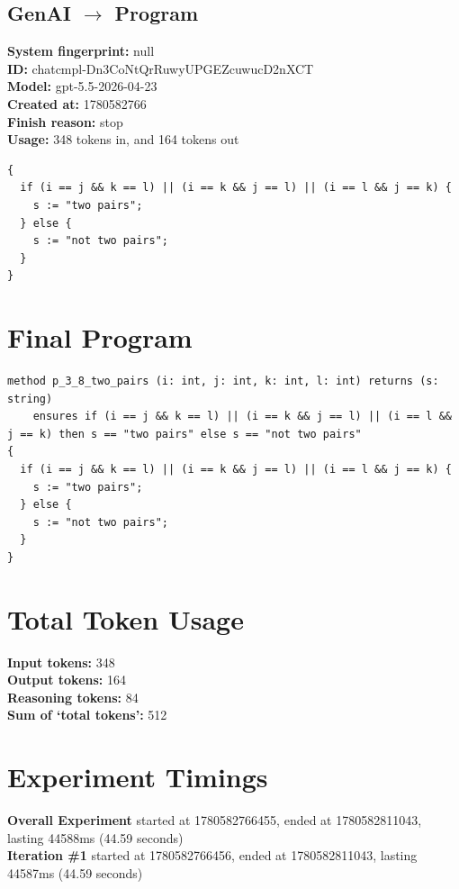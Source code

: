 \documentclass{article}
\begin{document}
\subsection*{GenAI $\rightarrow$ Program}
\textbf{System fingerprint: }null
\\\textbf{ID: }chatcmpl-Dn3CoNtQrRuwyUPGEZcuwucD2nXCT
\\\textbf{Model: }gpt-5.5-2026-04-23
\\\textbf{Created at: }1780582766
\\\textbf{Finish reason: }stop
\\\textbf{Usage: }348 tokens in, and 164 tokens out
\begin{lstlisting}
{
  if (i == j && k == l) || (i == k && j == l) || (i == l && j == k) {
    s := "two pairs";
  } else {
    s := "not two pairs";
  }
}
\end{lstlisting}
\section*{Final Program}
\begin{lstlisting}
method p_3_8_two_pairs (i: int, j: int, k: int, l: int) returns (s: string)
	ensures if (i == j && k == l) || (i == k && j == l) || (i == l && j == k) then s == "two pairs" else s == "not two pairs"
{
  if (i == j && k == l) || (i == k && j == l) || (i == l && j == k) {
    s := "two pairs";
  } else {
    s := "not two pairs";
  }
}
\end{lstlisting}
\section*{Total Token Usage}
\textbf{Input tokens: }348
\\\textbf{Output tokens: }164
\\\textbf{Reasoning tokens: }84
\\\textbf{Sum of `total tokens': }512
\section*{Experiment Timings}
\textbf{Overall Experiment} started at 1780582766455, ended at 1780582811043, lasting 44588ms (44.59 seconds)
\\\textbf{Iteration \#1} started at 1780582766456, ended at 1780582811043, lasting 44587ms (44.59 seconds)
\end{document}

